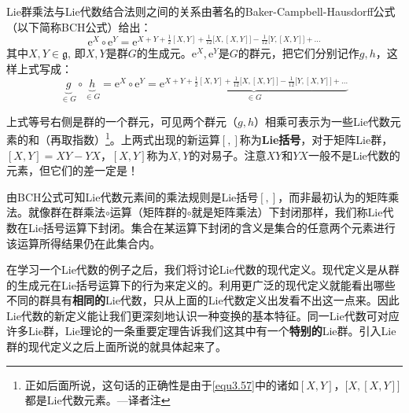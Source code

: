 Lie群乘法与Lie代数结合法则之间的关系由著名的Baker-Campbell-Hausdorff公式（以下简称BCH公式）给出：
\begin{equation}
\label{equ3.56}
\mathrm{e}^X \circ \mathrm{e}^Y = \mathrm{e}^{X + Y + \frac{1}{2}[X, Y] + \frac{1}{12} \big[X, [X, Y]\big] - \frac{1}{12} \big[Y, [X, Y]\big] + \dots  }
\end{equation}
其中$X, Y \in \mathfrak{g}$, 即$X, Y$是群$G$的生成元。$\mathrm{e}^X, \mathrm{e}^Y$是$G$的群元，把它们分别记作$g, h$，这样上式写成：
\begin{equation}
\label{equ3.57}
\underbrace{g}_{\in G} \circ \underbrace{h}_{\in G} = \mathrm{e}^X \circ \mathrm{e}^Y = \underbrace{\mathrm{e}^{ X + Y + \frac{1}{2} [X, Y] + \frac{1}{12}\big[X, [X, Y]\big] - \frac{1}{12} \big[Y, [X, Y]\big] + \dots }}_{\in G}
\end{equation}

上式等号右侧是群的一个群元，可见两个群元（$g,h$）相乘可表示为一些Lie代数元素的和（再取指数）\footnote{正如后面所说，这句话的正确性是由于\eqref{equ3.57}中的诸如$[X, Y]$，$\big[X, [X, Y]\big]$都是Lie代数元素。---译者注}。上两式出现的新运算$[,]$称为{\bfseries Lie括号}，对于矩阵Lie群，$[X, Y] = XY - YX$，$[X, Y]$称为$X, Y$的对易子。注意$XY$和$YX$一般不是Lie代数的元素，但它们的差一定是！

由BCH公式可知Lie代数元素间的乘法规则是Lie括号$[,]$，而非最初认为的矩阵乘法。就像群在群乘法$\circ$运算（矩阵群的$\circ$就是矩阵乘法）下封闭那样，我们称Lie代数在Lie括号运算下封闭。集合在某运算下封闭的含义是集合的任意两个元素进行该运算所得结果仍在此集合内。

在学习一个Lie代数的例子之后，我们将讨论Lie代数的现代定义。现代定义是从群的生成元在Lie括号运算下的行为来定义的。利用更广泛的现代定义就能看出哪些不同的群具有{\bfseries 相同的}Lie代数，只从上面的Lie代数定义出发看不出这一点来。因此Lie代数的新定义能让我们更深刻地认识一种变换的基本特征。同一Lie代数可对应许多Lie群，Lie理论的一条重要定理告诉我们这其中有一个{\bfseries 特别的}Lie群。引入Lie群的现代定义之后上面所说的就具体起来了。

